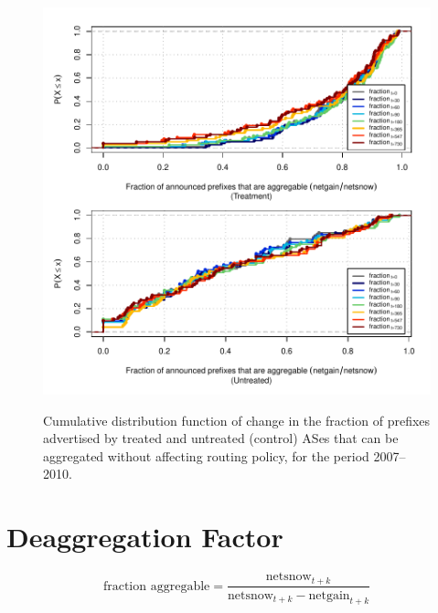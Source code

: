 \begin{figure}[H]
\begin{centering}
\begin{singlespace}
    \includegraphics[width=6in]{figures/behavior-frac_deagg-2007_2010-corr.pdf}
    \vspace{-2em}\\
    \caption{Cumulative distribution function of change in the fraction of prefixes advertised by treated and untreated (control) ASes that can be aggregated without affecting routing policy, for the period 2007--2010.}
\end{singlespace}
\end{centering}
\end{figure}

\section{Deaggregation Factor}

\[
\textrm{fraction aggregable} = \frac{\textrm{netsnow}_{t+k}}
                            {\textrm{netsnow}_{t+k} - \textrm{netgain}_{t+k}}
\]

